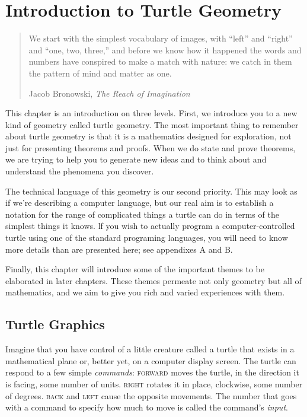 \documentclass{book}
\begin{document}
\tableofcontents
\listoffigures

\chapter{Introduction to Turtle Geometry}
\begin{quote}We start with the simplest vocabulary of images, with ``left'' and ``right'' and ``one, two, three,'' and before we know how it happened the words and numbers have conspired to make a match with nature: we catch in them the pattern of mind and matter as one.

Jacob Bronowski, {\em The Reach of Imagination}\end{quote}

This chapter is an introduction on three levels. First, we introduce you to a new kind of geometry called turtle geometry. The most important thing to remember about turtle geometry is that it is a mathematics designed for exploration, not just for presenting theorems and proofs. When we do state and prove theorems, we are trying to help you to generate new ideas and to think about and understand the phenomena you discover.

The technical language of this geometry is our second priority. This may look as if we're describing a computer language, but our real aim is to establish a notation for the range of complicated things a turtle can do in terms of the simplest things it knows. lf you wish to actually program a computer-controlled turtle using one of the standard programing languages, you will need to know more details than are presented here; see appendixes A and B.

Finally, this chapter will introduce some of the important themes to be elaborated in later chapters. These themes permeate not only geometry but all of mathematics, and we aim to give you rich and varied experiences with them.

\section{Turtle Graphics}
Imagine that you have control of a little creature called a turtle that exists in a mathematical plane or, better yet, on a computer display screen. The turtle can respond to a few simple {\em commands}: \textsc{forward} moves the turtle, in the direction it is facing, some number of units. \textsc{right} rotates it in place, clockwise, some number of degrees. \textsc{back} and \textsc{left} cause the opposite movements. The number that goes with a command to specify how much to move is called the command's {\em input}.
\end{document}
